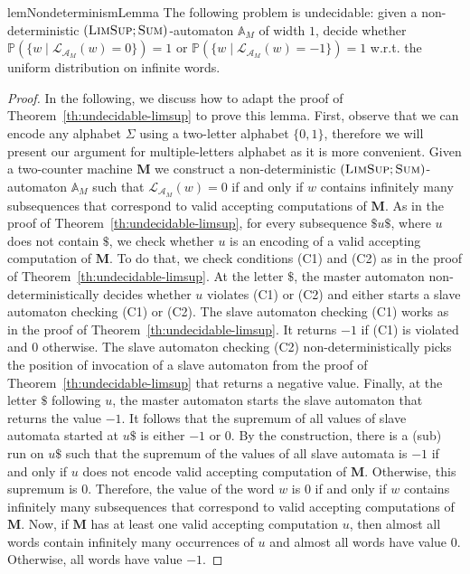 \documentclass{lmcs}
\newcommand{\nestedA}{\mathbb{A}}
\newcommand{\valueL}[1]{\mathcal{L}_{{#1}}}
\newcommand{\fsum}{\textsc{Sum}}
\newcommand{\flimsup}{\textsc{LimSup}}
\newcommand{\aut}{\mathcal{A}}
\newcommand{\probability}{\mathbb{P}}
\newcommand{\M}{\mathbf{M}}
\begin{document}
\begin{restatable}{lem}{NondeterminismLemma}\label{th:nondeterminism-is-hard}
The following problem is undecidable: given a non-deterministic $(\flimsup; \fsum)$-automaton $\nestedA_M$ of width $1$,
decide whether $\probability(\{ w \mid \valueL{\aut_M}(w) = 0 \}) = 1$ or $\probability(\{ w \mid \valueL{\aut_M}(w) = -1 \}) = 1$ w.r.t.
the uniform distribution on infinite words.
\end{restatable}
\begin{proof}
In the following, we discuss how to adapt the proof
of Theorem~\ref{th:undecidable-limsup} to prove this lemma.
First, observe that we can encode any alphabet $\Sigma$ using a two-letter alphabet $\{0,1\}$, therefore we will present our argument
for multiple-letters alphabet as it is more convenient.
Given a two-counter machine $\M$ we construct
 a non-deterministic $(\flimsup; \fsum)$-automaton $\nestedA_M$ such that $\valueL{\aut_M}(w) = 0$ if and only if $w$
contains infinitely many subsequences that correspond to valid accepting computations of $\M$.
As in the proof of Theorem~\ref{th:undecidable-limsup}, for every subsequence $\$ u \$$, where $u$ does not contain $\$$, we check whether $u$ is an encoding of a  valid accepting computation of $\M$.
To do that, we check conditions (C1) and (C2) as in the proof of Theorem~\ref{th:undecidable-limsup}.
At the letter $\$$, the master automaton non-deterministically decides whether $u$ violates (C1) or (C2) and either starts a slave automaton checking (C1) or (C2).
The slave automaton checking (C1) works as in the proof of Theorem~\ref{th:undecidable-limsup}.
It returns $-1$ if (C1) is violated and $0$ otherwise.
The slave automaton checking (C2) non-deterministically picks the position of invocation of a slave automaton
from the proof of Theorem~\ref{th:undecidable-limsup} that returns a negative value.
Finally, at the letter $\$$ following $u$, the master automaton starts the slave automaton that returns the value $-1$.
It follows that the supremum of all values of slave automata started at $u\$$ is either $-1$ or $0$.
By the construction, there is a (sub) run on $u\$$ such that the supremum of the values of all slave automata is
$-1$ if and only if $u$ does not encode valid accepting computation of $\M$.
Otherwise, this supremum is $0$.
Therefore, the value of the word $w$ is $0$ if and only if $w$ contains
infinitely many subsequences that correspond to valid accepting computations of $\M$.
Now, if $\M$ has at least one valid accepting computation $u$, then almost all words contain infinitely many
occurrences of $u$ and almost all words have value $0$. Otherwise, all words have value $-1$.
\end{proof}
\end{document}
